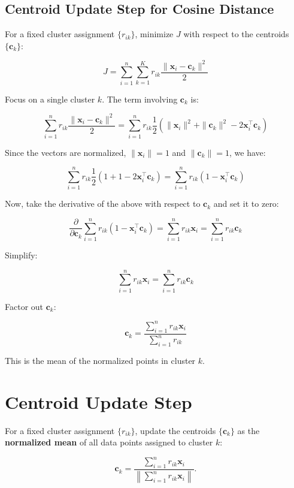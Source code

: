 \subsection*{Centroid Update Step for Cosine Distance}
For a fixed cluster assignment \( \{ r_{ik} \} \), minimize \( J \) with respect to the centroids \( \{ \mathbf{c}_k \} \):

\[
J = \sum_{i=1}^{n} \sum_{k=1}^{K} r_{ik} \frac{\|\mathbf{x}_i - \mathbf{c}_k\|^2}{2}
\]

Focus on a single cluster \( k \). The term involving \( \mathbf{c}_k \) is:

\[
\sum_{i=1}^{n} r_{ik} \frac{\|\mathbf{x}_i - \mathbf{c}_k\|^2}{2}
= \sum_{i=1}^{n} r_{ik} \frac{1}{2} \left( \|\mathbf{x}_i\|^2 + \|\mathbf{c}_k\|^2 - 2 \mathbf{x}_i^\top \mathbf{c}_k \right)
\]

Since the vectors are normalized, \( \|\mathbf{x}_i\| = 1 \) and \( \|\mathbf{c}_k\| = 1 \), we have:

\[
\sum_{i=1}^{n} r_{ik} \frac{1}{2} \left( 1 + 1 - 2 \mathbf{x}_i^\top \mathbf{c}_k \right)
= \sum_{i=1}^{n} r_{ik} \left( 1 - \mathbf{x}_i^\top \mathbf{c}_k \right)
\]

Now, take the derivative of the above with respect to \( \mathbf{c}_k \) and set it to zero:

\[
\frac{\partial}{\partial \mathbf{c}_k} \sum_{i=1}^{n} r_{ik} \left( 1 - \mathbf{x}_i^\top \mathbf{c}_k \right)
= \sum_{i=1}^{n} r_{ik} \mathbf{x}_i = \sum_{i=1}^{n} r_{ik} \mathbf{c}_k
\]

Simplify:

\[
\sum_{i=1}^{n} r_{ik} \mathbf{x}_i = \sum_{i=1}^{n} r_{ik} \mathbf{c}_k
\]

Factor out \( \mathbf{c}_k \):

\[
\mathbf{c}_k = \frac{\sum_{i=1}^{n} r_{ik} \mathbf{x}_i}{\sum_{i=1}^{n} r_{ik}}
\]

This is the mean of the normalized points in cluster \( k \).

\section*{Centroid Update Step}

For a fixed cluster assignment \( \{ r_{ik} \} \), update the centroids \( \{ \mathbf{c}_k \} \) as the \textbf{normalized mean} of all data points assigned to cluster \( k \):

\[
\mathbf{c}_k = \frac{\sum_{i=1}^{n} r_{ik} \mathbf{x}_i}{\left\| \sum_{i=1}^{n} r_{ik} \mathbf{x}_i \right\|}.
\]

